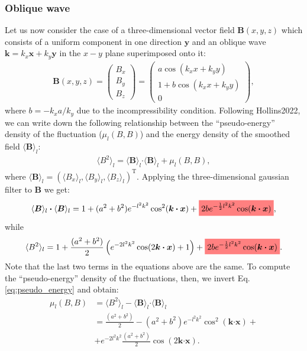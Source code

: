 \documentclass[]{article}
\newcommand{\mathcolorbox}[2]{\colorbox{#1}{$\displaystyle #2$}}
\newcommand{\bcdot}{\bm{\cdot}}
\begin{document}
\subsubsection{Oblique wave}

Let us now consider the case of a three-dimensional vector field $\bm B (x,y,z)$  which consists of a uniform component in one direction $\bm y$ and an oblique wave $\bm k = k_x \bm x + k_y \bm y$ in the $x-y$ plane superimposed onto it:
%
\begin{align}
	\bm B (x,y,z) = \begin{pmatrix}
		B_x \\ B_y \\ B_z
	\end{pmatrix} = \begin{pmatrix}
	a \cos \left(k_x x + k_y y\right)  \\ 1 + b \cos \left(k_x x + k_y y\right) \\ 0
	\end{pmatrix},
\end{align}
%
where $b = -k_x a / k_y$ due to the incompressibility condition.
Following Hollins2022, we can write down the following relationship between the ``pseudo-energy'' density of the fluctuation ($\mu_l(B,B)$) and the energy density of the smoothed field $\langle \bm B \rangle_l$:
%
\begin{align}\label{eq:pseudo_energy}
	\langle B^2 \rangle_l = \langle \bm B \rangle_l \bcdot\langle \bm B \rangle_l + \mu_l(B,B),
\end{align} 
%
where $\langle \bm B \rangle_l = \left(\langle B_x \rangle_l , \langle B_y \rangle_l, \langle B_z \rangle_l \right)^{\text{T}}$. Applying the three-dimensional gaussian filter to $\bm B$ we get:
%
\begin{align}
	\langle \bm B \rangle_l \bcdot\langle \bm B \rangle_l =  1 + (a^2 + b^2) e^{- l^2 k^2} \cos^2 (\bm k \bcdot\bm x) + \mathcolorbox{lred}{2b e^{-\frac{1}{2} l^2 k^2} \cos (\bm k \bcdot\bm x)} ,
\end{align}
%
while 
%
\begin{align}
	\langle B^2 \rangle_l = 1 + \frac{(a^2 + b^2)}{2}  \left(e^{-2 l^2 k^2} \cos (2 \bm k \bcdot\bm x)+1\right) + \mathcolorbox{lred}{2b e^{-\frac{1}{2} l^2 k^2} \cos (\bm k \bcdot\bm x)}.
\end{align}
%
Note that the last two terms in the equations above are the same. To compute the ``pseudo-energy'' density of the fluctuations, then, we invert Eq.\eqref{eq:pseudo_energy} and obtain:
%
\begin{align}
	\mu_l(B,B) &= \langle B^2 \rangle_l - \langle \bm B \rangle_l \bcdot\langle \bm B \rangle_l  \\
	&= \frac{(a^2 + b^2)}{2}  - (a^2 + b^2) e^{- l^2 k^2} \cos^2 (\bm k \bcdot\bm x) + \\
	&+ e^{- 2 l^2 k^2} \frac{(a^2 + b^2)}{2}  \cos (2 \bm k \bcdot\bm x) .
\end{align}
\end{document}
